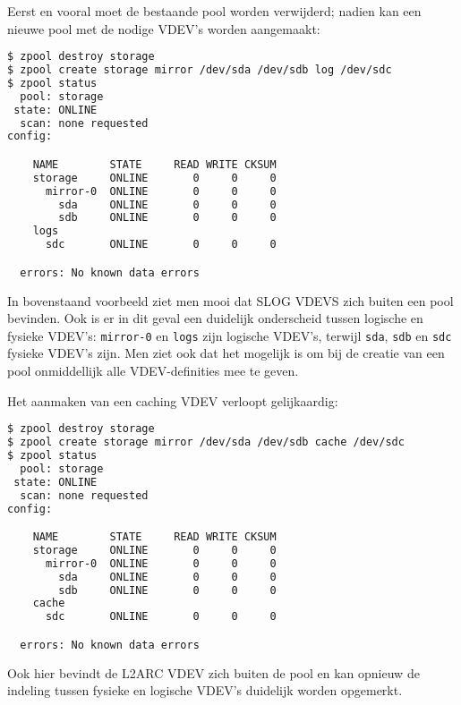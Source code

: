 Eerst en vooral moet de bestaande pool worden verwijderd; nadien kan een nieuwe pool met de nodige VDEV's worden aangemaakt:

\begin{lstlisting}[language=bash,style=command_style]
$ zpool destroy storage
$ zpool create storage mirror /dev/sda /dev/sdb log /dev/sdc
$ zpool status
  pool: storage
 state: ONLINE
  scan: none requested
config:

	NAME        STATE     READ WRITE CKSUM
	storage     ONLINE       0     0     0
	  mirror-0  ONLINE       0     0     0
	    sda     ONLINE       0     0     0
	    sdb     ONLINE       0     0     0
	logs
	  sdc       ONLINE       0     0     0

  errors: No known data errors
\end{lstlisting}

In bovenstaand voorbeeld ziet men mooi dat SLOG VDEVS zich buiten een pool bevinden. Ook is er in dit geval een duidelijk onderscheid tussen logische en fysieke VDEV's: \texttt{mirror-0} en \texttt{logs} zijn logische VDEV's, terwijl \texttt{sda}, \texttt{sdb} en \texttt{sdc} fysieke VDEV's zijn. Men ziet ook dat het mogelijk is om bij de creatie van een pool onmiddellijk alle VDEV-definities mee te geven.

Het aanmaken van een caching VDEV verloopt gelijkaardig:

\begin{lstlisting}[language=bash,style=command_style]
$ zpool destroy storage
$ zpool create storage mirror /dev/sda /dev/sdb cache /dev/sdc
$ zpool status
  pool: storage
 state: ONLINE
  scan: none requested
config:

	NAME        STATE     READ WRITE CKSUM
	storage     ONLINE       0     0     0
	  mirror-0  ONLINE       0     0     0
	    sda     ONLINE       0     0     0
	    sdb     ONLINE       0     0     0
	cache
	  sdc       ONLINE       0     0     0

  errors: No known data errors
\end{lstlisting}

Ook hier bevindt de L2ARC VDEV zich buiten de pool en kan opnieuw de indeling tussen fysieke en logische VDEV's duidelijk worden opgemerkt.
